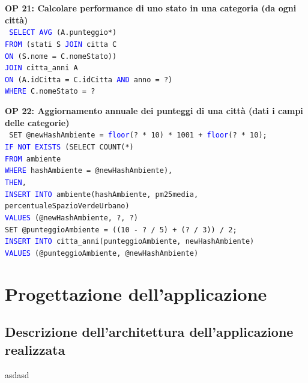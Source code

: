 \documentclass[a4paper,12pt]{report}
\begin{document}
            \noindent
            \textbf{OP 21: Calcolare performance di uno stato in una categoria (da ogni città)} \\
            \texttt{
                \textcolor{blue}{SELECT AVG} (A.punteggio*) \\
                \textcolor{blue}{FROM} (stati S \textcolor{blue}{JOIN} citta C \\
                \textcolor{blue}{ON} (S.nome = C.nomeStato)) \\
                \textcolor{blue}{JOIN} citta\_anni A \\
                \textcolor{blue}{ON} (A.idCitta = C.idCitta \textcolor{blue}{AND} anno = ?) \\
                \textcolor{blue}{WHERE} C.nomeStato = ? \\
            }

            \noindent
            \textbf{OP 22: Aggiornamento annuale dei punteggi di una città (dati i campi delle categorie)} \\
            \texttt{
                SET @newHashAmbiente = \textcolor{blue}{floor}(? * 10) * 1001 + \textcolor{blue}{floor}(? * 10); \\
                \textcolor{blue}{IF NOT EXISTS} (SELECT COUNT(*) \\
                \textcolor{blue}{FROM} ambiente \\
                \textcolor{blue}{WHERE} hashAmbiente = @newHashAmbiente),  \\
                \textcolor{blue}{THEN},  \\
                \textcolor{blue}{INSERT INTO} ambiente(hashAmbiente, pm25media, percentualeSpazioVerdeUrbano) \\
                \textcolor{blue}{VALUES} (@newHashAmbiente, ?, ?) \\
                SET @punteggioAmbiente = ((10 - ? / 5) + (? / 3)) / 2; \\
                \textcolor{blue}{INSERT INTO} citta\_anni(punteggioAmbiente, newHashAmbiente) \\
                \textcolor{blue}{VALUES} (@punteggioAmbiente, @newHashAmbiente) \\
            }

        \chapter{Progettazione dell'applicazione}
            
    	\section{Descrizione dell'architettura dell'applicazione realizzata}
        	asdasd
 
\end{document}
